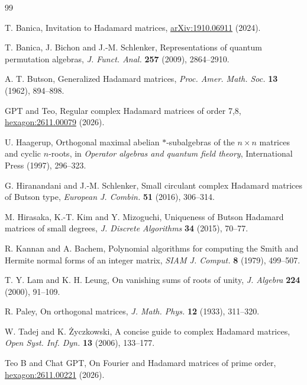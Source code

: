 \documentclass[11pt,a4paper]{article}
\theoremstyle{plain}
\theoremstyle{definition}
\theoremstyle{plain}
\begin{document}
\begingroup
\hypersetup{allcolors=black}
\begin{thebibliography}{99}
\setlength{\itemsep}{0pt}
 T. Banica, Invitation to Hadamard matrices, \href{https://arxiv.org/abs/1910.06911}{arXiv:1910.06911} (2024).

 T. Banica, J. Bichon and J.-M. Schlenker, Representations of quantum permutation algebras, \emph{J. Funct. Anal.} \textbf{257} (2009), 2864--2910.

 A. T. Butson, Generalized Hadamard matrices, \emph{Proc. Amer. Math. Soc.} \textbf{13} (1962), 894--898.

 GPT and Teo, Regular complex Hadamard matrices of order 7,8, \href{https://hexagonmath.org/2611.00079v1}{hexagon:2611.00079} (2026).

 U. Haagerup, Orthogonal maximal abelian $*$-subalgebras of the $n\times n$ matrices and cyclic $n$-roots, in \emph{Operator algebras and quantum field theory}, International Press (1997), 296--323.

 G. Hiranandani and J.-M. Schlenker, Small circulant complex Hadamard matrices of Butson type, \emph{European J. Combin.} \textbf{51} (2016), 306--314.

 M. Hirasaka, K.-T. Kim and Y. Mizoguchi, Uniqueness of Butson Hadamard matrices of small degrees, \emph{J. Discrete Algorithms} \textbf{34} (2015), 70--77.

 R. Kannan and A. Bachem, Polynomial algorithms for computing the Smith and Hermite normal forms of an integer matrix, \emph{SIAM J. Comput.} \textbf{8} (1979), 499--507.

 T. Y. Lam and K. H. Leung, On vanishing sums of roots of unity, \emph{J. Algebra} \textbf{224} (2000), 91--109.

 R. Paley, On orthogonal matrices, \emph{J. Math. Phys.} \textbf{12} (1933), 311--320.

 W. Tadej and K. \.Zyczkowski, A concise guide to complex Hadamard matrices, \emph{Open Syst. Inf. Dyn.} \textbf{13} (2006), 133--177.

 {\raggedright Teo B and Chat GPT, On Fourier and Hadamard matrices of prime order, \href{https://hexagonmath.org/2611.00221v1}{hexagon:2611.00221} (2026).\par}

\end{thebibliography}
\endgroup
\end{document}
